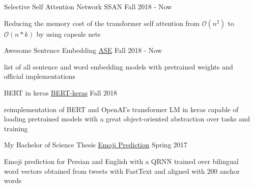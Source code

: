 

\begin{cventries}

\cventry
    {Selective Self Attention Network} %
    {SSAN} %
    {} %
    {Fall 2018 - Now} %
    {
      \begin{cvitems} %
        \item {Reducing the memory cost of the transformer self attention from $\mathcal{O}(n^{2})$ to $\mathcal{O}(n*k)$ by using capsule nets}
      \end{cvitems}
    }

\cventry
    {Awesome Sentence Embedding} %
    {\href{https://github.com/Separius/awesome-sentence-embedding}{ASE}} %
    {} %
    {Fall 2018 - Now} %
    {
      \begin{cvitems} %
        \item {list of all sentence and word embedding models with pretrained weights and official implementations}
      \end{cvitems}
    }
    
    
\cventry
	{BERT in keras}
	{\href{https://github.com/Separius/BERT-keras}{BERT-keras}}
	{}
	{Fall 2018}
	{
		\begin{cvitems}
			\item {reimplementation of BERT and OpenAI's transformer LM in keras capable of loading pretrained models with a great object-oriented abstraction over tasks and training}
		\end{cvitems}
	}

\cventry
    {My Bachelor of Science Thesis} %
    {\href{https://github.com/Separius/EmojiPrediction}{Emoji Prediction}} %
    {} %
    {Spring 2017} %
    {
      \begin{cvitems} %
        \item {Emoji prediction for Persian and English with a QRNN trained over bilingual word vectors obtained from tweets with FastText and aligned with 200 anchor words}
      \end{cvitems}
    }


\end{cventries}
